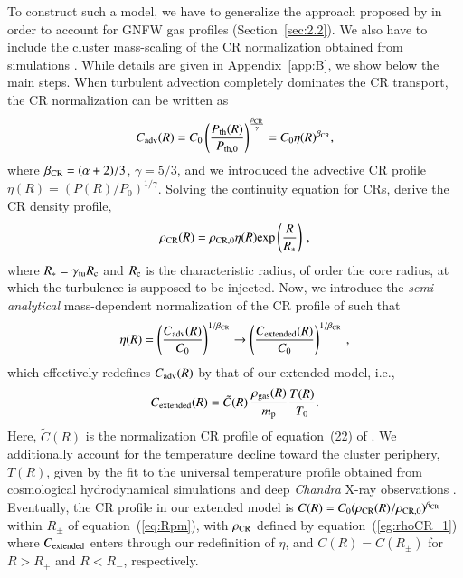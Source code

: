 \documentclass[useAMS,usenatbib]{mn2e}
\begin{document}
To construct such a model, we have to generalize the approach proposed by
\citet{2011A&A...527A..99E} in order to account for GNFW gas profiles
(Section~\ref{sec:2.2}). We also have to include the cluster mass-scaling of the
CR normalization obtained from simulations \citep{2010MNRAS.409..449P}. While
details are given in Appendix~\ref{app:B}, we show below the main steps. When
turbulent advection completely dominates the CR transport, the CR normalization
can be written as \citep{2011A&A...527A..99E}
\begin{equation}
C_{{\mathrm{adv}}}(R)=C_{0} \left( \frac{P_{{\mathrm{th}}}(R)}{P_{{\mathrm{th}},0}} \right)^{\frac{\beta_{{\mathrm{CR}}}}{\gamma}} = 
C_{0} \eta(R)^{\beta_{{\mathrm{CR}}}},
\label{eq:Csimple_1}
\end{equation} 
where $\beta_{{\mathrm{CR}}}=(\alpha+2)/3$, $\gamma=5/3$, and we introduced the
advective CR profile $\eta(R)=(P(R)/P_0)^{1/\gamma}$. Solving the continuity
equation for CRs, \citet{2011A&A...527A..99E} derive the CR density profile,
\begin{equation}
\rho_{{\mathrm{CR}}}(R) = \rho_{{\mathrm{CR}},0} \eta(R) {\mathrm{exp}} \left( \frac{R}{R_{*}} \right) \, ,
\label{eg:rhoCR_1}
\end{equation} 
where $R_{*}=\gamma_{{\mathrm{{\mathrm{tu}}}}}R_{{\mathrm{c}}}$ and $R_{{\mathrm{c}}}$ is the characteristic 
radius, of order the core radius, at which the turbulence is supposed to be injected.
Now, we introduce the \emph{semi-analytical} mass-dependent normalization of the
CR profile of \cite{2010MNRAS.409..449P} such that
\begin{equation}
\eta(R) = \left( \frac{C_{{\mathrm{adv}}}(R)}{C_0} \right)^{1/\beta_{{\mathrm{CR}}}} \to
\left( \frac{C_{{\mathrm{extended}}}(R)}{C_0} \right)^{1/\beta_{{\mathrm{CR}}}} \, ,
\label{eq:eta}
\end{equation} 
which effectively redefines $C_{{\mathrm{adv}}}(R)$ by that of our extended model, i.e.,
\begin{equation}
C_{{\mathrm{extended}}}(R) =  \tilde{C}(R)\, \frac{\rho_{{\mathrm{gas}}}(R)}{m_{\mathrm{p}}} \frac{T(R)}{T_0}.
\label{eq:Cf}
\end{equation} 
Here, $\tilde{C}(R)$ is the normalization CR profile of equation~(22) of
\cite{2010MNRAS.409..449P}. We additionally account for the temperature
decline toward the cluster periphery, $T(R)$, given by the fit to the universal
temperature profile obtained from cosmological hydrodynamical simulations
\citep{2007MNRAS.378..385P,2010MNRAS.409..449P} and deep {\em Chandra} X-ray
observations \citep{2005ApJ...628..655V}. Eventually, the CR profile in our
extended model is $C(R)=C_{0}(\rho_{{\mathrm{CR}}}(R) /
\rho_{{\mathrm{CR}},0})^{\beta_{{\mathrm{CR}}}}$ within $R_{\pm}$ of
equation~(\ref{eq:Rpm}), with $\rho_{{\mathrm{CR}}}$ defined by
equation~(\ref{eg:rhoCR_1}) where $C_{{\mathrm{extended}}}$ enters through our
redefinition of $\eta$, and $C(R) = C(R_{\pm})$ for $R > R_{+}$ and $R < R_{-}$,
respectively.
\end{document}
